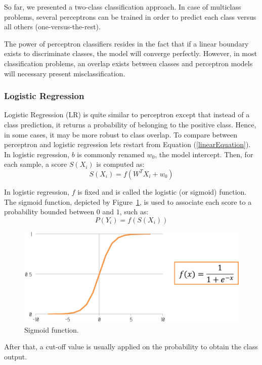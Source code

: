 \documentclass[a4paper,10pt]{article}
\begin{document}
So far, we presented a two-class classification approach. In case of multiclass problems, several perceptrons can be trained in order to predict each class versus all others (one-versus-the-rest).

The power of perceptron classifiers resides in the fact that if a linear boundary exists to discriminate classes, the model will converge perfectly. However, in most classification problems, an overlap exists between classes and perceptron models will necessary present misclassification. 

\subsubsection{Logistic Regression}

Logistic Regression (LR) is quite similar to perceptron except that instead of a class prediction, it returns a probability of belonging to the positive class. Hence, in some cases, it may be more robust to class overlap. 
To compare between perceptron and logistic regression lets restart from Equation (\ref{linearEquation}). In logistic regression, $b$ is commonly renamed $w_0$, the model intercept. Then, for each sample, a score $S(X_i)$ is computed as:
\begin{equation}
S(X_i) = f(W^TX_i+w_0)
\end{equation}

In logistic regression, $f$ is fixed and is called the logistic (or sigmoid) function. The sigmoid function, depicted by Figure~\ref{sigmoid}, is used to associate each score to a probability bounded between $0$ and $1$, such as:
\begin{equation}
P(Y_i) = f(S(X_i))
\end{equation}

\begin{figure}[htbp]
\centerline{\includegraphics[width=0.6\linewidth]{./figures/sigmoid.png}}
\caption{Sigmoid function.}
\label{sigmoid}
\end{figure}

After that, a cut-off value is usually applied on the probability to obtain the class output.
\end{document}
